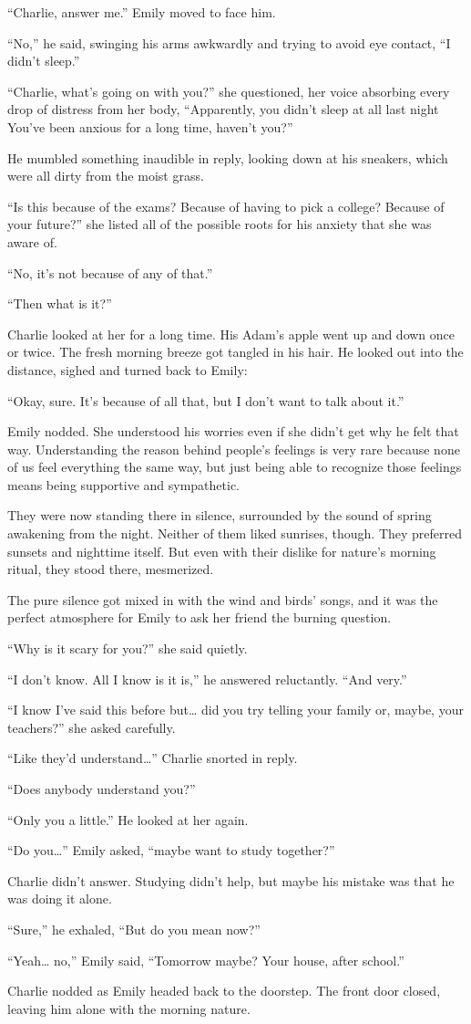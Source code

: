 “Charlie, answer me.” Emily moved to face him.

“No,” he said, swinging his arms awkwardly and trying to avoid eye contact, “I didn’t sleep.”

“Charlie, what’s going on with you?” she questioned, her voice absorbing every drop of distress from her body, “Apparently, you didn't sleep at all last night You’ve been anxious for a long time, haven’t you?”

He mumbled something inaudible in reply, looking down at his sneakers, which were all dirty from the moist grass.

“Is this because of the exams? Because of having to pick a college? Because of your future?” she listed all of the possible roots for his anxiety that she was aware of.

“No, it’s not because of any of that.”

“Then what is it?”

Charlie looked at her for a long time. His Adam’s apple went up and down once or twice. The fresh morning breeze got tangled in his hair. He looked out into the distance, sighed and turned back to Emily:

“Okay, sure. It’s because of all that, but I don’t want to talk about it.”

Emily nodded. She understood his worries even if she didn't get why he felt that way. Understanding the reason behind people’s feelings is very rare because none of us feel everything the same way, but just being able to recognize those feelings means being supportive and sympathetic.

They were now standing there in silence, surrounded by the sound of spring awakening from the night. Neither of them liked sunrises, though. They preferred sunsets and nighttime itself. But even with their dislike for nature’s morning ritual, they stood there, mesmerized.

The pure silence got mixed in with the wind and birds’ songs, and it was the perfect atmosphere for Emily to ask her friend the burning question.

“Why is it scary for you?” she said quietly.

“I don’t know. All I know is it is,” he answered reluctantly. “And very.”

“I know I’ve said this before but… did you try telling your family or, maybe, your teachers?” she asked carefully.

“Like they’d understand…” Charlie snorted in reply.

“Does anybody understand you?”

“Only you a little.” He looked at her again.

“Do you…” Emily asked, “maybe want to study together?”

Charlie didn’t answer. Studying didn’t help, but maybe his mistake was that he was doing it alone.

“Sure,” he exhaled, “But do you mean now?”

“Yeah… no,” Emily said, “Tomorrow maybe? Your house, after school.”

Charlie nodded as Emily headed back to the doorstep. The front door closed, leaving him alone with the morning nature.